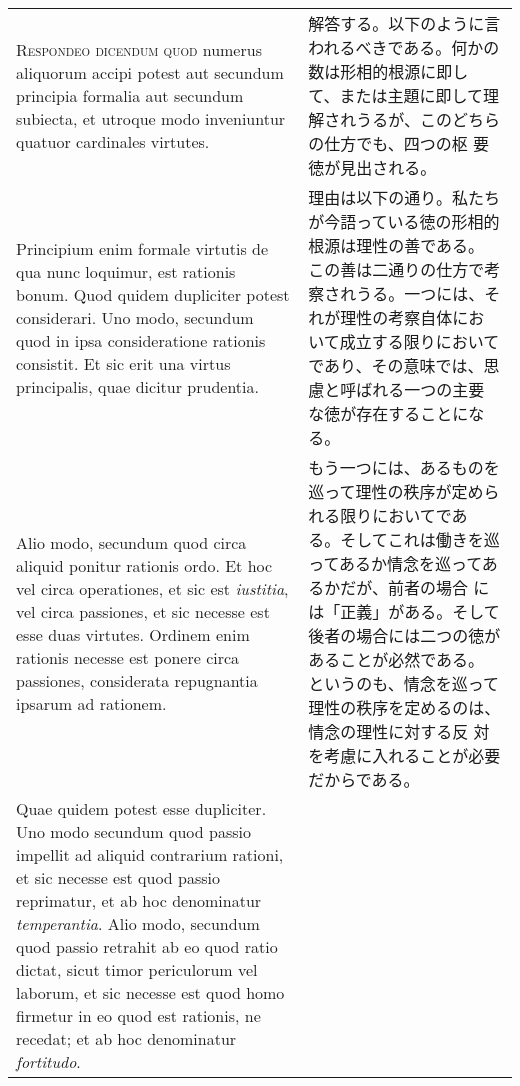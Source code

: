 \documentclass[10pt]{jsarticle}
\begin{document}
\begin{longtable}{p{21em}p{21em}}
\\




 {\scshape Respondeo dicendum quod} numerus aliquorum accipi potest
 aut secundum principia formalia aut secundum subiecta, et utroque
 modo inveniuntur quatuor cardinales virtutes. 


&

 解答する。以下のように言われるべきである。何かの数は形相的根源に即し
 て、または主題に即して理解されうるが、このどちらの仕方でも、四つの枢
 要徳が見出される。


\\


 Principium enim formale virtutis de qua nunc loquimur, est rationis
 bonum.  Quod quidem dupliciter potest considerari. Uno modo, secundum
 quod in ipsa consideratione rationis consistit. Et sic erit una
 virtus principalis, quae dicitur prudentia. 


&

理由は以下の通り。私たちが今語っている徳の形相的根源は理性の善である。
この善は二通りの仕方で考察されうる。一つには、それが理性の考察自体にお
いて成立する限りにおいてであり、その意味では、思慮と呼ばれる一つの主要
な徳が存在することになる。

 

\\


Alio modo, secundum quod circa aliquid ponitur rationis ordo. Et hoc
 vel circa operationes, et sic est {\itshape iustitia}, vel circa
 passiones, et sic necesse est esse duas virtutes. Ordinem enim
 rationis necesse est ponere circa passiones, considerata repugnantia
 ipsarum ad rationem.

 &

 もう一つには、あるものを巡って理性の秩序が定められる限りにおいてであ
 る。そしてこれは働きを巡ってあるか情念を巡ってあるかだが、前者の場合
 には「正義」がある。そして後者の場合には二つの徳があることが必然である。
 というのも、情念を巡って理性の秩序を定めるのは、情念の理性に対する反
 対を考慮に入れることが必要だからである。
 
 \\
 


 Quae quidem potest esse dupliciter. Uno modo secundum quod passio
 impellit ad aliquid contrarium rationi, et sic necesse est quod
 passio reprimatur, et ab hoc denominatur {\itshape temperantia}. Alio
 modo, secundum quod passio retrahit ab eo quod ratio dictat, sicut
 timor periculorum vel laborum, et sic necesse est quod homo firmetur
 in eo quod est rationis, ne recedat; et ab hoc denominatur {\itshape
 fortitudo}.


\end{longtable}
\end{document}
